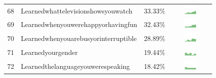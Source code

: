 \documentclass[a4paper,12pt]{article}
\begin{document}
\begin{longtable}{| p{0.5cm} | p{7cm} | p{1cm} | c |}
68 & Learnedwhattelevisionshowsyouwatch & 33.33\% & \includegraphics[width = 2cm, height = 0.5cm]{learnedwhattelevisionshowsyouwatchPUBLIC} \\  
69 & Learnedwhenyouwerehappyorhavingfun & 32.43\% & \includegraphics[width = 2cm, height = 0.5cm]{learnedwhenyouwerehappyorhavingfunPUBLIC} \\  
70 & Learnedwhenyouarebusyorinterruptible & 28.89\% & \includegraphics[width = 2cm, height = 0.5cm]{learnedwhenyouarebusyorinterruptiblePUBLIC} \\  
71 & Learnedyourgender & 19.44\% & \includegraphics[width = 2cm, height = 0.5cm]{learnedyourgenderPUBLIC} \\  
72 & Learnedthelanguageyouwerespeaking & 18.42\% & \includegraphics[width = 2cm, height = 0.5cm]{learnedthelanguageyouwerespeakingPUBLIC} \\  
\end{longtable}
\end{document}
